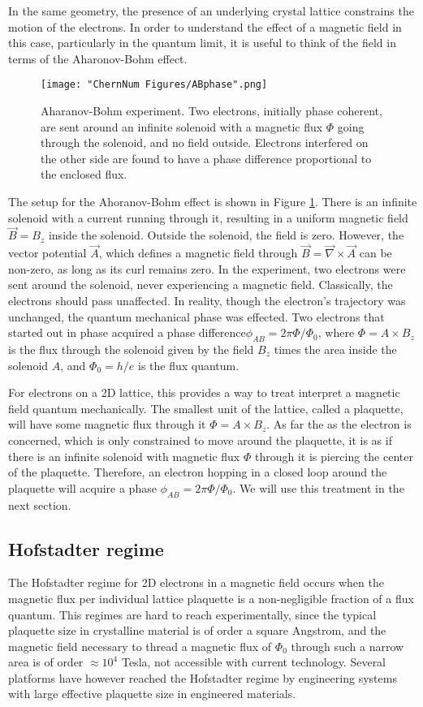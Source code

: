 In the same geometry, the presence of an underlying crystal lattice constrains the motion of the electrons. In order to understand the effect of a magnetic field in this case, particularly in the quantum limit, it is useful to think of the field in terms of the Aharonov-Bohm effect.
\begin{figure}
	\texttt{[image: "ChernNum Figures/ABphase".png]}
\label{fig:ABphase}
\caption[Aharanov-Bohm experiment]{Aharanov-Bohm experiment. Two electrons, initially phase coherent, are sent around an infinite solenoid with a magnetic flux $\Phi$ going through the solenoid, and no field outside. Electrons interfered on the other side are found to have a phase difference proportional to the enclosed flux. }
\end{figure}
The setup for the Ahoranov-Bohm effect is shown in Figure \ref{fig:ABphase}. There is an infinite solenoid with a current running through it, resulting in a uniform magnetic field $\vec{B}=B_z$\ez{} inside the solenoid. Outside the solenoid, the field is zero. However, the vector potential $\vec{A}$, which defines a magnetic field through $\vec{B} = \vec{\nabla}\times\vec{A}$ can be non-zero, as long as its curl remains zero.  In the experiment\cite{Aharonov1959}, two electrons were sent around the solenoid, never experiencing a magnetic field. Classically, the electrons should pass unaffected. In reality, though the electron's trajectory was unchanged, the quantum mechanical phase was effected. Two electrons that started out in phase acquired a phase difference$\phi_{AB} =2\pi \Phi/\Phi_0$, where $\Phi = A\times B_z$ is the flux through the solenoid given by the field $B_z$ times the area inside the solenoid $A$, and $\Phi_0 = h/e$ is the flux quantum. 

For electrons on a 2D lattice, this provides a way to treat interpret a magnetic field quantum mechanically. The smallest unit of the lattice, called a plaquette, will have some magnetic flux through it $\Phi = A\times B_z$. As far the as the electron is concerned, which is only constrained to move around the plaquette, it is as if there is an infinite solenoid with magnetic flux $\Phi$ through it is piercing the center of the plaquette. Therefore, an electron hopping in a closed loop around the plaquette will acquire a phase $\phi_{AB} =2\pi \Phi/\Phi_0$. We will use this treatment in the next section.

\subsection{Hofstadter regime}
The Hofstadter regime\cite{Hofstadter1976} for 2D electrons in a magnetic field occurs when the magnetic flux per individual lattice plaquette is a non-negligible fraction of a flux quantum. This regimes are hard to reach experimentally, since the typical plaquette size in crystalline material is of order a square Angstrom, and the magnetic field necessary to thread a magnetic flux of $\Phi_0$ through such a narrow area is of order $\approx10^4$ Tesla, not accessible with current technology. Several platforms have however reached the Hofstadter regime by engineering systems with large effective plaquette size in engineered materials\cite{Geisler2004,Hunt2013}.

